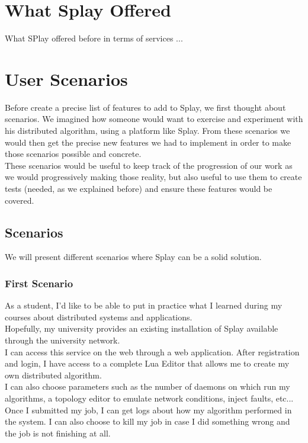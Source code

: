 \documentclass{eplmastersthesis}
\begin{document}
    \section{What Splay Offered} %

      What SPlay offered before in terms of services ...

    \section{User Scenarios}

      Before create a precise list of features to add to Splay, we first
      thought about scenarios. We imagined how someone would want to exercise
      and experiment with his distributed algorithm, using a platform like
      Splay. From these scenarios we would then get the precise new features
      we had to implement in order to make those scenarios possible and
      concrete.\\

      These scenarios would be useful to keep track of the progression of our
      work as we would progressively making those reality, but also useful
      to use them to create tests (needed, as we explained before) and ensure
      these features would be covered.

      \subsection{Scenarios}

        We will present different scenarios where Splay can be a solid solution.

        \subsubsection{First Scenario}

          As a student, I'd like to be able to put in practice what I learned
          during my courses about distributed systems and applications.\\
          Hopefully, my university provides an existing installation of Splay
          available through the university network.\\
          I can access this service on the web through a web application. After
          registration and login, I have access to a complete Lua Editor that
          allows me to create my own distributed algorithm.\\
          I can also choose parameters such as the number of daemons on
          which run my algorithms, a topology editor to emulate network
          conditions, inject faults, etc...\\
          Once I submitted my job, I can get logs about how my algorithm
          performed in the system. I can also choose to kill my job in case
          I did something wrong and the job is not finishing at all.
\end{document}
